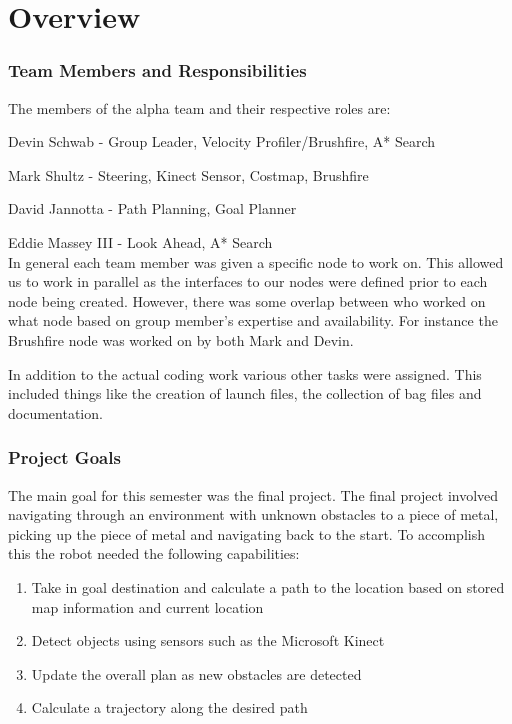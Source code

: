 \part{Overview}

\section{Team Members and Responsibilities}

The members of the alpha team and their respective roles are:

Devin Schwab - Group Leader, Velocity Profiler/Brushfire, A* Search

Mark Shultz - Steering, Kinect Sensor, Costmap, Brushfire

David Jannotta - Path Planning, Goal Planner

Eddie Massey III - Look Ahead, A* Search\\

In general each team member was given a specific node to work on. This allowed us to work in parallel as the interfaces to our nodes were defined prior to each node being created. However, there was some overlap between who worked on what node based on group member's expertise and availability.  For instance the Brushfire node was worked on by both Mark and Devin.

In addition to the actual coding work various other tasks were assigned. This included things like the creation of launch files, the collection of bag files and documentation.

\section{Project Goals}
The main goal for this semester was the final project. The final project involved navigating through an environment with unknown obstacles to a piece of metal, picking up the piece of metal and navigating back to the start. To accomplish this the robot needed the following capabilities:

\begin{enumerate}
     \item Take in goal destination and calculate a path to the location based on stored map information and current location
     \item Detect objects using sensors such as the Microsoft Kinect
     \item Update the overall plan as new obstacles are detected
     \item Calculate a trajectory along the desired path
\end{enumerate}

